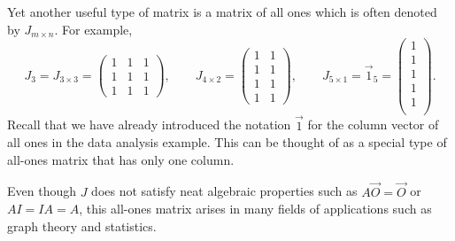 \documentclass{ximera}
\begin{document}
Yet another useful type of matrix is a matrix of all ones which is
often denoted by $J_{m \times n}$. For example,
\[
  J_{3} = J_{3 \times 3} =
  \begin{pmatrix}
    1 & 1 & 1 \\
    1 & 1 & 1 \\
    1 & 1 & 1
  \end{pmatrix}, \qquad
  J_{4 \times 2} =
  \begin{pmatrix}
    1 & 1 \\
    1 & 1 \\
    1 & 1 \\
    1 & 1
  \end{pmatrix}, \qquad
  J_{5 \times 1} = \vec{1}_5 =
  \begin{pmatrix}
    1 \\ 1 \\ 1 \\ 1 \\ 1 \\
  \end{pmatrix}.
\]
Recall that we have already introduced the notation $\vec{1}$ for the
column vector of all ones in the data analysis example. This can be
thought of as a special type of all-ones matrix that has only one
column.

Even though $J$ does not satisfy neat algebraic properties such as
$A \vec{O} = \vec{O}$ or $AI = IA = A$, this all-ones matrix arises in
many fields of applications such as graph theory and statistics.

\end{document}
